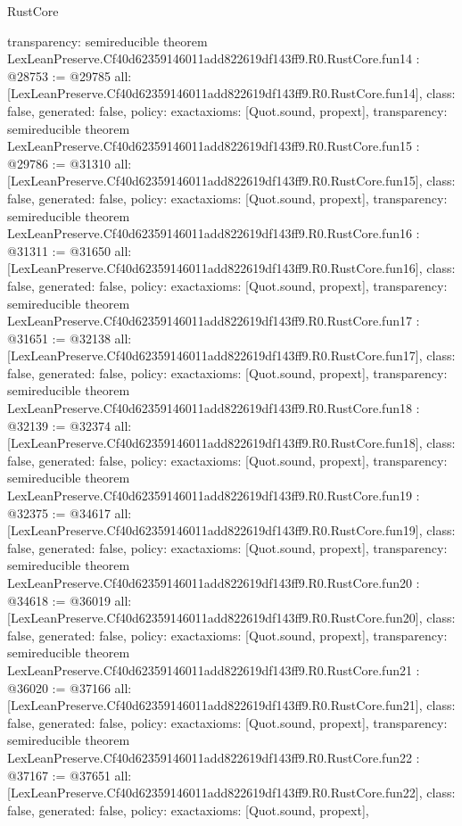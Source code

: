 \begin{lexlean}{RustCore}
\begin{coremodule}
{  transparency: semireducible
}
theorem LexLeanPreserve.Cf40d62359146011add822619df143ff9.R0.RustCore.fun14 : @28753 := @29785 {
  all: [LexLeanPreserve.Cf40d62359146011add822619df143ff9.R0.RustCore.fun14],
  class: false,
  generated: false,
  policy: exact{axioms: [Quot.sound, propext]},
  transparency: semireducible
}
theorem LexLeanPreserve.Cf40d62359146011add822619df143ff9.R0.RustCore.fun15 : @29786 := @31310 {
  all: [LexLeanPreserve.Cf40d62359146011add822619df143ff9.R0.RustCore.fun15],
  class: false,
  generated: false,
  policy: exact{axioms: [Quot.sound, propext]},
  transparency: semireducible
}
theorem LexLeanPreserve.Cf40d62359146011add822619df143ff9.R0.RustCore.fun16 : @31311 := @31650 {
  all: [LexLeanPreserve.Cf40d62359146011add822619df143ff9.R0.RustCore.fun16],
  class: false,
  generated: false,
  policy: exact{axioms: [Quot.sound, propext]},
  transparency: semireducible
}
theorem LexLeanPreserve.Cf40d62359146011add822619df143ff9.R0.RustCore.fun17 : @31651 := @32138 {
  all: [LexLeanPreserve.Cf40d62359146011add822619df143ff9.R0.RustCore.fun17],
  class: false,
  generated: false,
  policy: exact{axioms: [Quot.sound, propext]},
  transparency: semireducible
}
theorem LexLeanPreserve.Cf40d62359146011add822619df143ff9.R0.RustCore.fun18 : @32139 := @32374 {
  all: [LexLeanPreserve.Cf40d62359146011add822619df143ff9.R0.RustCore.fun18],
  class: false,
  generated: false,
  policy: exact{axioms: [Quot.sound, propext]},
  transparency: semireducible
}
theorem LexLeanPreserve.Cf40d62359146011add822619df143ff9.R0.RustCore.fun19 : @32375 := @34617 {
  all: [LexLeanPreserve.Cf40d62359146011add822619df143ff9.R0.RustCore.fun19],
  class: false,
  generated: false,
  policy: exact{axioms: [Quot.sound, propext]},
  transparency: semireducible
}
theorem LexLeanPreserve.Cf40d62359146011add822619df143ff9.R0.RustCore.fun20 : @34618 := @36019 {
  all: [LexLeanPreserve.Cf40d62359146011add822619df143ff9.R0.RustCore.fun20],
  class: false,
  generated: false,
  policy: exact{axioms: [Quot.sound, propext]},
  transparency: semireducible
}
theorem LexLeanPreserve.Cf40d62359146011add822619df143ff9.R0.RustCore.fun21 : @36020 := @37166 {
  all: [LexLeanPreserve.Cf40d62359146011add822619df143ff9.R0.RustCore.fun21],
  class: false,
  generated: false,
  policy: exact{axioms: [Quot.sound, propext]},
  transparency: semireducible
}
theorem LexLeanPreserve.Cf40d62359146011add822619df143ff9.R0.RustCore.fun22 : @37167 := @37651 {
  all: [LexLeanPreserve.Cf40d62359146011add822619df143ff9.R0.RustCore.fun22],
  class: false,
  generated: false,
  policy: exact{axioms: [Quot.sound, propext]},
}
\end{coremodule}
\end{lexlean}
